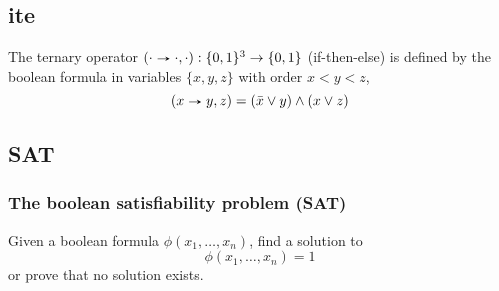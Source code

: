 \documentclass{beamer}
\newcommand{\ite}[3]{(#1 ~\tikz[baseline] \draw[->, -stealth] (0ex,.5ex)--(2ex,.5ex);~ #2 , #3)}
\begin{document}
\subsection[ite]{ite}
\begin{frame}
\begin{example}
The ternary operator $\ite{\cdot}{\cdot}{\cdot} : \{0,1\}^3 \to \{0,1\}$ (if-then-else) is defined by the boolean formula in variables $\{x,y,z\}$ with order $x<y<z$,
$$\ite{x}{y}{z} = (\bar{x} \lor y) \land (x \lor z)$$
\end{example}
\end{frame}




\subsection[SAT]{SAT}
\begin{frame}
\frametitle{The boolean satisfiability problem (SAT)}
Given a boolean formula $\phi(x_1,\dots,x_n)$, find a solution to
$$\phi(x_1,\dots,x_n) = 1$$
or prove that no solution exists.
\end{frame}
\end{document}
